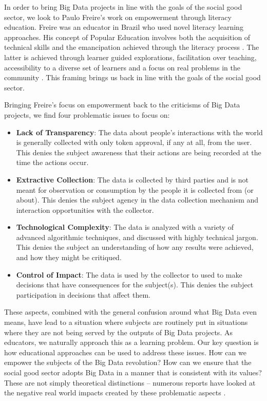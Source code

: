 \documentclass{sig-alternate}
\begin{document}
In order to bring Big Data projects in line with the goals of the social good sector, we look to Paulo Freire's work on empowerment through literacy education. Freire was an educator in Brazil who used novel literacy learning approaches. His concept of Popular Education involves both the acquisition of technical skills and the emancipation achieved through the literacy process \cite{freire_pedagogy_1968}. The latter is achieved through learner guided explorations, facilitation over teaching, accessibility to a diverse set of learners and a focus on real problems in the community \cite{bhargava_popular_2013}. This framing brings us back in line with the goals of the social good sector.

Bringing Freire's focus on empowerment back to the criticisms of Big Data projects, we find four problematic issues to focus on:

\begin{itemize} 
\item \textbf{Lack of Transparency}: The data about people's interactions with the world is generally collected with only token approval, if any at all, from the user. This denies the subject awareness that their actions are being recorded at the time the actions occur.
\item \textbf{Extractive Collection}: The data is collected by third parties and is not meant for observation or consumption by the people it is collected from (or about). This denies the subject agency in the data collection mechanism and interaction opportunities with the collector.
\item \textbf{Technological Complexity}: The data is analyzed with a variety of advanced algorithmic techniques, and discussed with highly technical jargon.  This denies the subject an understanding of how any results were achieved, and how they might be critiqued.
\item \textbf{Control of Impact}: The data is used by the collector to used to make decisions that have consequences for the subject(s).  This denies the subject participation in decisions that affect them.
\end{itemize}

These aspects, combined with the general confusion around what Big Data even means, have lead to a situation where subjects are routinely put in situations where they are not being served by the outputs of Big Data projects. As educators, we naturally approach this as a learning problem.  Our key question is how educational approaches can be used to address these issues.  How can we empower the subjects of the Big Data revolution? How can we ensure that the social good sector adopts Big Data in a manner that is consistent with its values? These are not simply theoretical distinctions – numerous reports have looked at the negative real world impacts created by these problematic aspects \cite{gurstein_open_2011}.  
\end{document}
